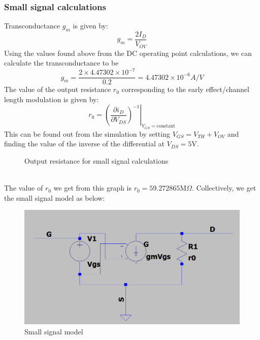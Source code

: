 \documentclass[titlepage]{article}
\begin{document}
\subsubsection{Small signal calculations}
Transconductance $g_m$ is given by:
$$g_m=\frac{2I_D}{V_{OV}}$$
Using the values found above from the DC operating point calculations, we can calculate the transconductance to be
$$g_m=\frac{2\times4.47302\times10^{-7}}{0.2}=4.47302\times10^{-6}A/V$$
The value of the output resistance $r_0$ corresponding to the early effect/channel length modulation is given by:
$$r_0=\left(\left.\frac{\partial i_D}{\partial V_{DS}}\right)^{-1}\right|_{V_{GS}=\mathrm{constant}}$$
This can be found out from the simulation by setting $V_{GS}=V_{TH}+V_{OV}$ and finding the value of the inverse of the differential at $V_{DS}=5$V.
\begin{figure}[ht]
    \centering
    \caption{Output resistance for small signal calculations}
    \label{fig:r0}
\end{figure}\\
The value of $r_0$ we get from this graph is $r_0=59.272865\mathrm{M}\Omega$.
Collectively, we get the small signal model as below:
\begin{figure}[ht]
    \centering
    \includegraphics[scale=0.35]{resources/ssmodel.png}
    \caption{Small signal model}
    \label{fig:small_signal}
\end{figure}
\newpage
\end{document}
